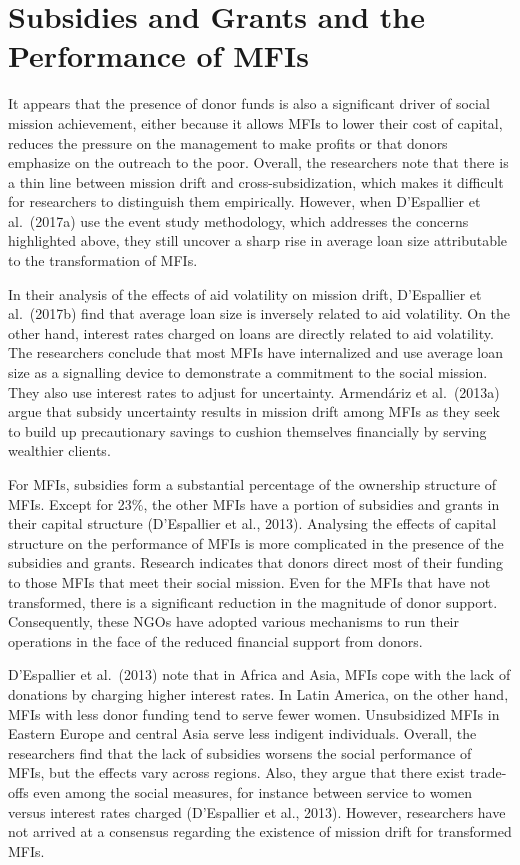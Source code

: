 \documentclass[a4paper, nobind]{templates/ociamthesis}
\begin{document}
\hypertarget{subsidies-and-grants-and-the-performance-of-mfis}{%
\section{Subsidies and Grants and the Performance of MFIs}\label{subsidies-and-grants-and-the-performance-of-mfis}}

\noindent It appears that the presence of donor funds is also a significant driver of social mission achievement, either because it allows MFIs to lower their cost of capital, reduces the pressure on the management to make profits or that donors emphasize on the outreach to the poor. Overall, the researchers note that there is a thin line between mission drift and cross-subsidization, which makes it difficult for researchers to distinguish them empirically. However, when D'Espallier et al.~(2017a) use the event study methodology, which addresses the concerns highlighted above, they still uncover a sharp rise in average loan size attributable to the transformation of MFIs.

In their analysis of the effects of aid volatility on mission drift, D'Espallier et al.~(2017b) find that average loan size is inversely related to aid volatility. On the other hand, interest rates charged on loans are directly related to aid volatility. The researchers conclude that most MFIs have internalized and use average loan size as a signalling device to demonstrate a commitment to the social mission. They also use interest rates to adjust for uncertainty. Armendáriz et al.~(2013a) argue that subsidy uncertainty results in mission drift among MFIs as they seek to build up precautionary savings to cushion themselves financially by serving wealthier clients.

For MFIs, subsidies form a substantial percentage of the ownership structure of MFIs. Except for 23\%, the other MFIs have a portion of subsidies and grants in their capital structure (D'Espallier et al., 2013). Analysing the effects of capital structure on the performance of MFIs is more complicated in the presence of the subsidies and grants. Research indicates that donors direct most of their funding to those MFIs that meet their social mission. Even for the MFIs that have not transformed, there is a significant reduction in the magnitude of donor support. Consequently, these NGOs have adopted various mechanisms to run their operations in the face of the reduced financial support from donors.

D'Espallier et al.~(2013) note that in Africa and Asia, MFIs cope with the lack of donations by charging higher interest rates. In Latin America, on the other hand, MFIs with less donor funding tend to serve fewer women. Unsubsidized MFIs in Eastern Europe and central Asia serve less indigent individuals. Overall, the researchers find that the lack of subsidies worsens the social performance of MFIs, but the effects vary across regions. Also, they argue that there exist trade-offs even among the social measures, for instance between service to women versus interest rates charged (D'Espallier et al., 2013). However, researchers have not arrived at a consensus regarding the existence of mission drift for transformed MFIs.
\end{document}
